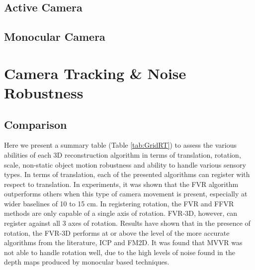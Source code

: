\subsection{Active Camera}
\label{ActiveSOTA}


\subsection{Monocular Camera}
\label{Sec:MonocularSOTA}


\section{Camera Tracking \& Noise Robustness}
\label{Sec:CamTransTrackExp}


\subsection{Comparison}


Here we present a summary table (Table \ref{tab:GridRT}) to assess the various abilities of each 3D reconstruction algorithm in terms of translation, rotation, scale, non-static object motion robustness and ability to handle various sensory types. In terms of translation, each of the presented algorithms can register with respect to translation. In experiments, it was shown that the FVR algorithm outperforms others when this type of camera movement is present, especially at wider baselines of 10 to 15 cm. In registering rotation, the FVR and FFVR methods are only capable of a single axis of rotation. FVR-3D, however, can register against all 3 axes of rotation. Results have shown that in the presence of rotation, the FVR-3D performs at or above the level of the more accurate algorithms from the literature, ICP and FM2D. It was found that MVVR was not able to handle rotation well, due to the high levels of noise found in the depth maps produced by monocular based techniques. \\

